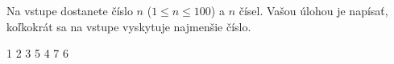 




Na vstupe dostanete číslo $n$ ($1\leq n\leq 100$) a $n$ čísel. Vašou úlohou je napísať, koľkokrát sa
na vstupe vyskytuje najmenšie číslo.

1 2 3 5 4 7 6
\koniec


